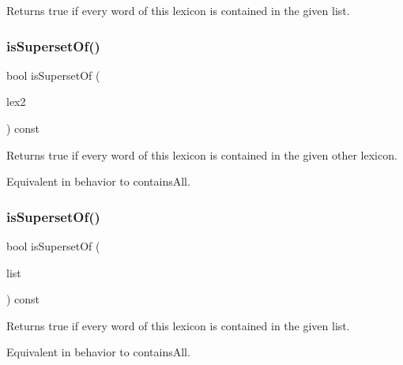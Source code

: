 Returns {\ttfamily true} if every word of this lexicon is contained in the given list. 

\mbox{\label{classDawgLexicon_a16ee2d6dbb050435a7f5cf4dd0cc777c}} 
\subsubsection{\texorpdfstring{is\+Superset\+Of()}{isSupersetOf()}\hspace{0.1cm}{\footnotesize\ttfamily [1/2]}}
{\footnotesize\ttfamily bool is\+Superset\+Of (\begin{DoxyParamCaption}\item[{const \mbox{\hyperlink{classDawgLexicon}{Dawg\+Lexicon}} \&}]{lex2 }\end{DoxyParamCaption}) const}



Returns {\ttfamily true} if every word of this lexicon is contained in the given other lexicon. 

Equivalent in behavior to contains\+All. \mbox{\label{classDawgLexicon_a217cbc1e6ba9f694645608c8a17c1943}} 
\subsubsection{\texorpdfstring{is\+Superset\+Of()}{isSupersetOf()}\hspace{0.1cm}{\footnotesize\ttfamily [2/2]}}
{\footnotesize\ttfamily bool is\+Superset\+Of (\begin{DoxyParamCaption}\item[{std\+::initializer\+\_\+list$<$ std\+::string $>$}]{list }\end{DoxyParamCaption}) const}



Returns {\ttfamily true} if every word of this lexicon is contained in the given list. 

Equivalent in behavior to contains\+All. \mbox{\label{classDawgLexicon_a2e4e14ffb291ba4d5475b9b66d2a12c8}} 

